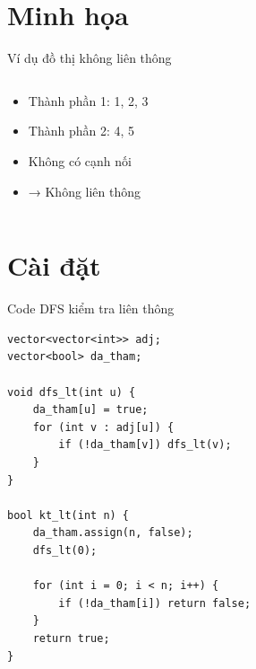 \documentclass{beamer}
\begin{document}
\section{Minh họa}

\begin{frame}{Ví dụ đồ thị không liên thông}
\begin{columns}


\begin{tcolorbox}
\begin{itemize}
\item \faUsers Thành phần 1: 1, 2, 3
\item \faUsers Thành phần 2: 4, 5
\item \faTimes Không có cạnh nối
\item \faExclamationTriangle → Không liên thông
\end{itemize}
\end{tcolorbox}

\end{columns}
\end{frame}

\section{Cài đặt}


\begin{frame}[fragile]{Code DFS kiểm tra liên thông}
\begin{tcolorbox}
\begin{lstlisting}
vector<vector<int>> adj;
vector<bool> da_tham;

void dfs_lt(int u) {
    da_tham[u] = true;
    for (int v : adj[u]) {
        if (!da_tham[v]) dfs_lt(v);
    }
}

bool kt_lt(int n) {
    da_tham.assign(n, false);
    dfs_lt(0);

    for (int i = 0; i < n; i++) {
        if (!da_tham[i]) return false;
    }
    return true;
}
\end{lstlisting}
\end{tcolorbox}
\end{frame}
\end{document}
